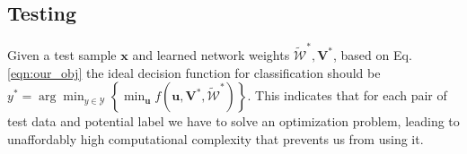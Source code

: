 \documentclass{article}
\makeatletter
\newcommand*{\rom}[1]{\expandafter\@slowromancap\romannumeral #1@}
\makeatother
\begin{document}
    
    
    
   
    

\subsection{Testing}\label{ssec:testing}
Given a test sample $\mathbf{x}$ and learned network weights $\tilde{\mathcal{W}}^*, \mathbf{V}^*$, based on Eq. \ref{eqn:our_obj} the ideal decision function for classification should be $y^*=\arg\min_{y\in\mathcal{Y}} \left\{ \min_{\mathbf{u}} f(\mathbf{u}, \mathbf{V}^*, \tilde{\mathcal{W}}^*) \right\}.$ This indicates that for each pair of test data and potential label we have to solve an optimization problem, leading to unaffordably high computational complexity that prevents us from using it. 
    
\end{document}

